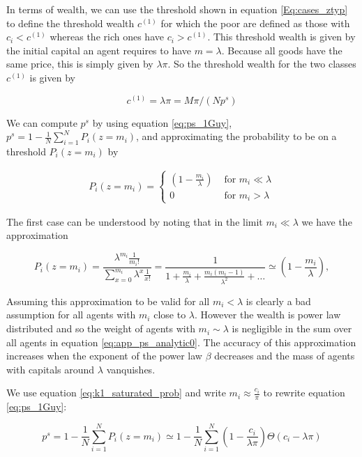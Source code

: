 In terms of wealth, we can use the threshold shown in equation \eqref{Eq:cases_ztyp} to define the threshold wealth $c^{(1)}$ for which the poor are defined as those with $c_i<c^{(1)}$ whereas the rich ones have $c_i>c^{(1)}$. This threshold wealth is given by the initial capital an agent requires to have $m = \lambda$. Because all goods have the same price, this is simply given by $\lambda \pi$. So the threshold wealth for the two classes $c^{(1)}$ is given by

\begin{equation}
c^{(1)} = \lambda \pi = M \pi/(N p^s)
\label{eq:c1}
\end{equation}

We can compute $p^s$ by using equation \eqref{eq:ps_1Guy}, $p^s = 1 - \frac{1}{N} \sum_{i=1}^{N} P_i(z = m_i)$, and approximating the probability to be on a threshold $P_i(z=m_i)$ by

\begin{align}
P_i(z=m_i) = 
\begin{cases}
\left( 1 - \frac{m_i}{\lambda} \right) & \text{ for } m_i \ll \lambda \\
0 & \text{ for } m_i > \lambda
\end{cases}
\label{eq:k1_saturated_prob}
\end{align}

The first case can be understood by noting that in the limit $m_i \ll \lambda$ we have the approximation

\begin{equation}
P_i(z=m_i) = \frac{\lambda^{m_i} \frac{1}{m_i!}}{\sum_{x=0}^{m_i} \lambda^x \frac{1}{x!}} = \frac{1}{1 + \frac{m_i}{\lambda} + \frac{m_i (m_i -1)}{\lambda^2} + \ldots} \simeq  \left( 1 - \frac{m_i}{\lambda} \right),
\end{equation}

Assuming this approximation to be valid for all $m_i < \lambda$ is clearly a bad assumption for all agents with $m_i$ close to $\lambda$. However the wealth is power law distributed and so the weight of agents with $m_i \sim \lambda$ is negligible in the sum over all agents in equation \eqref{eq:app_ps_analytic0}. The accuracy of this approximation increases when the exponent of the power law $\beta$ decreases and the mass of agents with capitals around $\lambda$ vanquishes. 

We use equation \eqref{eq:k1_saturated_prob} and write $m_i \approx \frac{c_i}{\pi}$ to rewrite equation \eqref{eq:ps_1Guy}:

\begin{equation}
\label{eq:ps_first_approx}
p^s = 1 - \frac{1}{N} \sum_{i=1}^{N} P_i(z = m_i) \simeq 1 - \frac{1}{N} \sum_{i=1}^N \left(1 - \frac{c_i}{\lambda \pi}\right) \Theta\left(c_i - \lambda \pi \right)
\end{equation}


